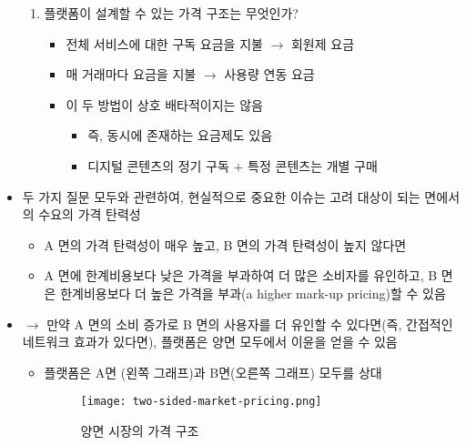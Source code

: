 \begin{itemize}
\begin{enumerate}
	\item 플랫폼이 설계할 수 있는 가격 구조는 무엇인가?
		\begin{itemize}
		\item  전체 서비스에 대한 구독 요금을 지불 $\rightarrow$ 회원제 요금
		\item 매 거래마다 요금을 지불 $\rightarrow$ 사용량 연동 요금
		\item 이 두 방법이 상호 배타적이지는 않음
			\begin{itemize}
			\item	 즉, 동시에 존재하는 요금제도 있음
			\item 디지털 콘텐츠의 정기 구독 $+$ 특정 콘텐츠는 개별 구매
			\end{itemize}
		\end{itemize}
	\end{enumerate}
\item 두 가지 질문 모두와 관련하여, 현실적으로 중요한 이슈는 고려 대상이 되는 면에서의 수요의 가격 탄력성 \cite[pp. 129--130]{Rysman:2009aa}
	\begin{itemize}
	\item A 면의 가격 탄력성이 매우 높고, B 면의 가격 탄력성이 높지 않다면
	\item A 면에 한계비용보다 낮은 가격을 부과하여 더 많은 소비자를 유인하고, B 면은 한계비용보다 더 높은 가격을 부과(a higher mark-up pricing)할 수 있음
	\end{itemize}		
\item $\rightarrow$ 만약 A 면의 소비 증가로 B 면의 사용자를 더 유인할 수 있다면(즉, 간접적인 네트워크 효과가 있다면), 플랫폼은 양면 모두에서 이윤을 얻을 수 있음	
	\begin{itemize}
	\item 플랫폼은 A면 (왼쪽 그래프)과 B면(오른쪽 그래프) 모두를 상대

		\begin{figure}[htbp]
		\begin{center}
		\texttt{[image: two-sided-market-pricing.png]}
		\caption{양면 시장의 가격 구조}
		\label{fig:two-sided-market-pricing}
		\end{center}
		\end{figure}
	

\end{itemize}
\end{itemize}
